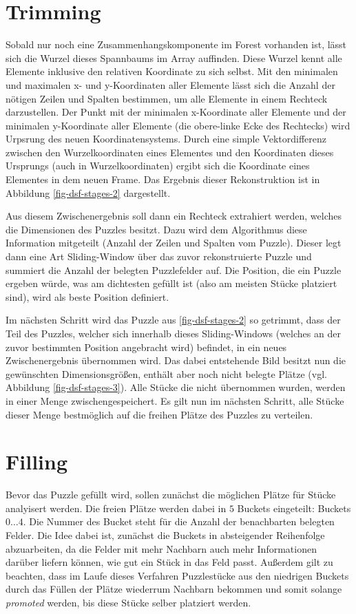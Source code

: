 \documentclass{whswinvcbook}
\begin{document}
\section{Trimming}
Sobald nur noch eine Zusammenhangskomponente im Forest vorhanden ist, lässt sich die Wurzel dieses Spannbaums im Array auffinden. Diese Wurzel kennt alle Elemente inklusive den relativen Koordinate zu sich selbst. Mit den minimalen und maximalen x- und y-Koordinaten aller Elemente lässt sich die Anzahl der nötigen Zeilen und Spalten bestimmen, um alle Elemente in einem Rechteck darzustellen. Der Punkt mit der minimalen x-Koordinate aller Elemente und der minimalen y-Koordinate aller Elemente (die obere-linke Ecke des Rechtecks) wird Urpsrung des neuen Koordinatensystems. Durch eine simple Vektordifferenz zwischen den Wurzelkoordinaten eines Elementes und den Koordinaten dieses Ursprungs (auch in Wurzelkoordinaten) ergibt sich die Koordinate eines Elementes in dem neuen Frame. Das Ergebnis dieser Rekonstruktion ist in Abbildung \ref{fig-dsf-stages-2} dargestellt.

Aus diesem Zwischenergebnis soll dann ein Rechteck extrahiert werden, welches die Dimensionen des Puzzles besitzt. Dazu wird dem Algorithmus diese Information mitgeteilt (Anzahl der Zeilen und Spalten vom Puzzle). Dieser legt dann eine Art Sliding-Window über das zuvor rekonstruierte Puzzle und summiert die Anzahl der belegten Puzzlefelder auf. Die Position, die ein Puzzle ergeben würde, was am dichtesten gefüllt ist (also am meisten Stücke platziert sind), wird als beste Position definiert.

Im nächsten Schritt wird das Puzzle aus \ref{fig-dsf-stages-2} so getrimmt, dass der Teil des Puzzles, welcher sich innerhalb dieses Sliding-Windows (welches an der zuvor bestimmten Position angebracht wird) befindet, in ein neues Zwischenergebnis übernommen wird. Das dabei entstehende Bild besitzt nun die gewünschten Dimensionsgrößen, enthält aber noch nicht belegte Plätze (vgl. Abbildung \ref{fig-dsf-stages-3}). Alle Stücke die nicht übernommen wurden, werden in einer Menge zwischengespeichert. Es gilt nun im nächsten Schritt, alle Stücke dieser Menge bestmöglich auf die freihen Plätze des Puzzles zu verteilen.
\section{Filling}
Bevor das Puzzle gefüllt wird, sollen zunächst die möglichen Plätze für Stücke analyisert werden. Die freien Plätze werden dabei in $5$ Buckets eingeteilt: Buckets $0\dots4$. Die Nummer des Bucket steht für die Anzahl der benachbarten belegten Felder. Die Idee dabei ist, zunächst die Buckets in absteigender Reihenfolge abzuarbeiten, da die Felder mit mehr Nachbarn auch mehr Informationen darüber liefern können, wie gut ein Stück in das Feld passt. Außerdem gilt zu beachten, dass im Laufe dieses Verfahren Puzzlestücke aus den niedrigen Buckets durch das Füllen der Plätze wiederrum Nachbarn bekommen und somit solange \textit{promoted} werden, bis diese Stücke selber platziert werden.
\end{document}
